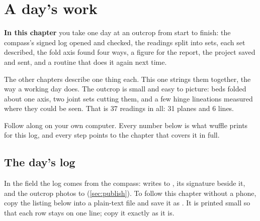 \chapter{A day's work}\label{ch:workflow}
\begin{goals}
\textbf{In this chapter} you take one day at an outcrop from start to finish: the compass's signed log
opened and checked, the readings split into sets, each set described, the fold axis found four ways, a
figure for the report, the project saved and sent, and a routine that does it again next time.
\end{goals}

The other chapters describe one thing each. This one strings them together, the way a working day
does. The outcrop is small and easy to picture: beds folded about one axis, two joint sets cutting them,
and a few hinge lineations measured where they could be seen. That is 37 readings in all: 31 planes and
6 lines.

Follow along on your own computer. Every number below is what wuffle prints for this log, and every
step points to the chapter that covers it in full.

\section{The day's log}\label{sec:wf-log}

In the field the log comes from the compass:  writes  to
, its signature  beside it, and the outcrop photos to
 (\cref{sec:publish}). To follow this chapter without a phone, copy the listing below
into a plain-text file and save it as . It is printed small so that each row stays
on one line; copy it exactly as it is.

